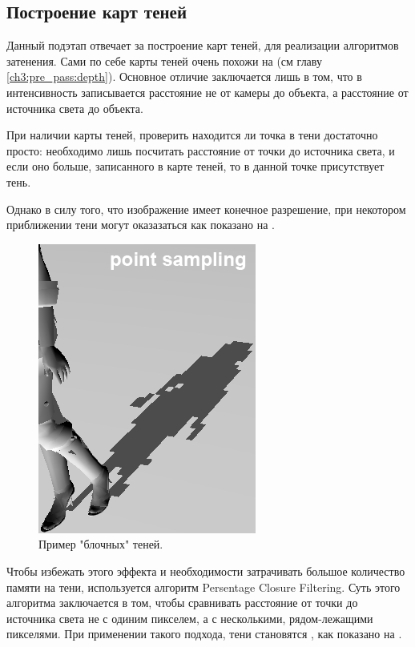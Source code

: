 	\subsection{Построение карт теней} \label{ch3:pre_pass:shadow_maps}
		Данный подэтап отвечает за построение карт теней, для реализации алгоритмов затенения. Сами по себе карты теней очень похожи на (см главу \ref{ch3:pre_pass:depth}). Основное отличие заключается лишь в том, что в интенсивность записывается расстояние не от камеры до объекта, а расстояние от источника света до объекта.
		
		При наличии карты теней, проверить находится ли точка в тени достаточно просто: необходимо лишь посчитать расстояние от точки до источника света, и если оно больше, записанного в карте теней, то в данной точке присутствует тень.
		
		Однако в силу того, что изображение имеет конечное разрешение, при некотором приближении тени могут оказазаться  как показано на .
		 
		 \begin{figure}[ht!] 
		 	\center
		 	\includegraphics [scale=1] {my_folder/images//blocky_shadows}	
		 	\caption{Пример "блочных" теней.} 
		 	\label{fig:blocky_shadows}
		 \end{figure}
		 
		 Чтобы избежать этого эффекта и необходимости затрачивать большое количество памяти на тени, используется алгоритм Persentage Closure Filtering. Суть этого алгоритма заключается в том, чтобы сравнивать расстояние от точки до источника света не с одиним пикселем, а с несколькими, рядом-лежащими пикселями. При применении такого подхода, тени становятся , как показано на .
		 
